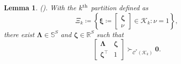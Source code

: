 \documentclass{article}
\newtheorem{lemma}{Lemma}
\begin{document}
\begin{lemma} \textup{(\cite[Lemma 4]{minimum-ellipsoids}).}
\label{lem:interior-point}
With the $k^\textup{th}$ partition %
defined as 
\begin{equation*}
    \Xi_k \coloneqq \left\{\bm \xi \coloneqq \begin{bmatrix}\bm \zeta\\ \nu \end{bmatrix} \in \mathcal{K}_k:
    \nu = 1
     \right\},
\end{equation*}
there exist $\bm \Lambda \in \mathbb{S}^S$ and $\bm \zeta \in \mathbb{R}^S$ such that 
\begin{equation*}
    \begin{bmatrix}
\bm \Lambda & \bm \zeta\\ 
 \bm \zeta^\top & 1 
\end{bmatrix} \succ_{\mathcal{C^*}(\mathcal{K}_k)} \bm 0.
\end{equation*}
\end{lemma}
\end{document}
